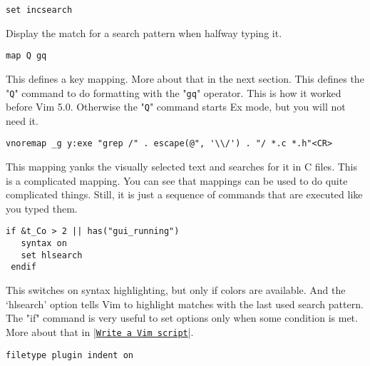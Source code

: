 \begin{Verbatim}[samepage=true]
 set incsearch
\end{Verbatim}

Display the match for a search pattern when halfway typing it.

 \begin{Verbatim}[samepage=true]
 map Q gq
 \end{Verbatim}

This defines a key mapping.
More about that in the next section.
This defines the "\texttt{Q}" command to do formatting with the "\texttt{gq}" operator.
This is how it worked before Vim 5.0.
Otherwise the "\texttt{Q}" command starts Ex mode, but you will not need it.

 \begin{Verbatim}[samepage=true]
 vnoremap _g y:exe "grep /" . escape(@", '\\/') . "/ *.c *.h"<CR>
 \end{Verbatim}

This mapping yanks the visually selected text and searches for it in C files.
This is a complicated mapping.
You can see that mappings can be used to do quite complicated things.
Still, it is just a sequence of commands that are executed like you typed them.

 \begin{Verbatim}[samepage=true]
 if &t_Co > 2 || has("gui_running")
   syntax on
   set hlsearch
 endif
 \end{Verbatim}

This switches on syntax highlighting, but only if colors are available.
And the `hlsearch' option tells Vim to highlight matches with the last used search pattern.
The "if" command is very useful to set options only when some condition is met.
More about that in |\hyperref[Write a Vim script]{\texttt{Write a Vim script}}|.
\label{vimrc-filetype}
 \begin{Verbatim}[samepage=true]
 filetype plugin indent on
 \end{Verbatim}

